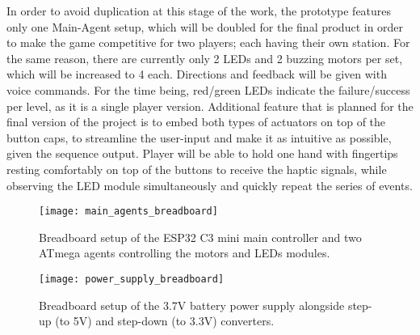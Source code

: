 \documentclass[a4paper]{article}
\begin{document}
In order to avoid duplication at this stage of the work, the prototype features only one Main-Agent setup, which will be doubled for the final product in order to make the game competitive for two players; each having their own station.
For the same reason, there are currently only 2 LEDs and 2 buzzing motors per set, which will be increased to 4 each.
Directions and feedback will be given with voice commands. For the time being, red/green LEDs indicate the failure/success per level, as it is a single player version.
Additional feature that is planned for the final version of the project is to embed both types of actuators on top of the button caps, to streamline the user-input and make it as intuitive as possible, given the sequence output. Player will be able to hold one hand with fingertips resting comfortably on top of the buttons to receive the haptic signals, while observing the LED module simultaneously and quickly repeat the series of events.


\begin{figure*}[!htb]
  \centering
  \texttt{[image: main\_agents\_breadboard]}
  \caption[Breadboard with main and two agents.]{Breadboard setup of the ESP32 C3 mini main controller and two ATmega agents controlling the motors and LEDs modules.}
  \label{fig:main_agents_breadboard}
\end{figure*}

\begin{figure*}[!htb]
  \centering
  \texttt{[image: power\_supply\_breadboard]}
  \caption[Breadboard with the power supply setup.]{Breadboard setup of the 3.7V battery power supply alongside step-up (to 5V) and step-down (to 3.3V) converters.}
  \label{fig:power_supply_breadboard}
\end{figure*}
\end{document}
